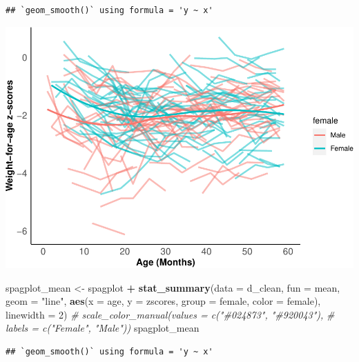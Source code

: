 \documentclass[
]{article}
\newenvironment{Shaded}{\begin{snugshade}}{\end{snugshade}}
\newcommand{\AttributeTok}[1]{\textcolor[rgb]{0.13,0.29,0.53}{#1}}
\newcommand{\CommentTok}[1]{\textcolor[rgb]{0.56,0.35,0.01}{\textit{#1}}}
\newcommand{\DecValTok}[1]{\textcolor[rgb]{0.00,0.00,0.81}{#1}}
\newcommand{\FunctionTok}[1]{\textcolor[rgb]{0.13,0.29,0.53}{\textbf{#1}}}
\newcommand{\NormalTok}[1]{#1}
\newcommand{\OtherTok}[1]{\textcolor[rgb]{0.56,0.35,0.01}{#1}}
\newcommand{\SpecialCharTok}[1]{\textcolor[rgb]{0.81,0.36,0.00}{\textbf{#1}}}
\newcommand{\StringTok}[1]{\textcolor[rgb]{0.31,0.60,0.02}{#1}}
\begin{document}
\begin{verbatim}
## `geom_smooth()` using formula = 'y ~ x'
\end{verbatim}

\includegraphics{ProblemSet3_ts_1677791812_files/figure-latex/unnamed-chunk-5-1.pdf}

\begin{Shaded}
\begin{Highlighting}[]
\NormalTok{spagplot\_mean }\OtherTok{\textless{}{-}}\NormalTok{ spagplot }\SpecialCharTok{+} 
  \FunctionTok{stat\_summary}\NormalTok{(}\AttributeTok{data =}\NormalTok{ d\_clean, }
               \AttributeTok{fun =}\NormalTok{ mean, }
               \AttributeTok{geom =} \StringTok{"line"}\NormalTok{,}
               \FunctionTok{aes}\NormalTok{(}\AttributeTok{x =}\NormalTok{ age, }\AttributeTok{y =}\NormalTok{ zscores, }\AttributeTok{group =}\NormalTok{ female, }\AttributeTok{color =}\NormalTok{ female), }
               \AttributeTok{linewidth =} \DecValTok{2}\NormalTok{) }
  \CommentTok{\# scale\_color\_manual(values = c("\#024873", "\#920043"),}
  \CommentTok{\#                    labels = c("Female", "Male"))}
\NormalTok{spagplot\_mean}
\end{Highlighting}
\end{Shaded}

\begin{verbatim}
## `geom_smooth()` using formula = 'y ~ x'
\end{verbatim}
\end{document}
